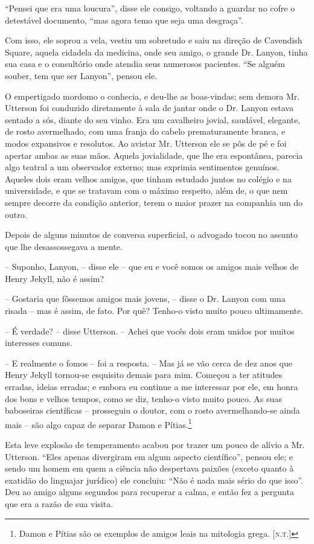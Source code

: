 “Pensei que era uma loucura”, disse ele consigo, voltando a guardar no
cofre o detestável documento, “mas agora temo que seja uma desgraça”.

Com isso, ele soprou a vela, vestiu um sobretudo e saiu na direção de
Cavendish Square, aquela cidadela da medicina, onde seu amigo, o grande
Dr. Lanyon, tinha sua casa e o consultório onde atendia seus numerosos
pacientes.  “Se alguém souber, tem que ser Lanyon”, pensou ele.

O empertigado mordomo o conhecia, e deu-lhe as boas-vindas; sem demora
Mr. Utterson foi conduzido diretamente à sala de jantar onde o Dr.
Lanyon estava sentado a sós, diante do seu vinho. Era um cavalheiro
jovial, saudável, elegante, de rosto avermelhado, com uma franja do
cabelo prematuramente branca, e modos expansivos e resolutos.  Ao
avistar Mr. Utterson ele se pôs de pé e foi apertar ambas as suas mãos.
 Aquela jovialidade, que lhe era espontânea, parecia algo teatral a um
observador externo; mas exprimia sentimentos genuínos.  Aqueles dois
eram velhos amigos, que tinham estudado juntos no colégio e na
universidade, e que se tratavam com o máximo respeito, além de, o que
nem sempre decorre da condição anterior, terem o maior prazer na
companhia um do outro. 

Depois de alguns minutos de conversa superficial, o advogado tocou no
assunto que lhe desassossegava a mente.

-- Suponho, Lanyon, -- disse ele -- que eu e você somos os amigos mais
velhos de Henry Jekyll, não é assim? 

-- Gostaria que fôssemos amigos mais jovens, -- disse o Dr. Lanyon com
uma risada -- mas é assim, de fato.  Por quê?  Tenho-o visto muito pouco
ultimamente.

-- É verdade? -- disse Utterson. -- Achei que vocês dois eram unidos por
muitos interesses comuns.

-- E realmente o fomos -- foi a resposta. -- Mas já se vão cerca de dez
anos que Henry Jekyll tornou-se esquisito demais para mim.  Começou a
ter atitudes erradas, ideias erradas; e embora eu continue a me
interessar por ele, em honra dos bons e velhos tempos, como se diz,
tenho-o visto muito pouco.  As suas baboseiras científicas -- prosseguiu
o doutor, com o rosto avermelhando-se ainda mais -- são algo capaz de
separar Damon e Pítias.\footnote{ Damon e Pítias são os exemplos de amigos
leais na mitologia grega. [\textsc{n.t.}]}

Esta leve explosão de temperamento acabou por trazer um pouco de alívio
a Mr. Utterson. “Eles apenas divergiram em algum aspecto científico”,
pensou ele; e sendo um homem em quem a ciência não despertava paixões
(exceto quanto à exatidão do linguajar jurídico) ele concluiu: “Não é
nada mais sério do que isso”.  Deu ao amigo alguns segundos para
recuperar a calma, e então fez a pergunta que era a razão de sua
visita.

